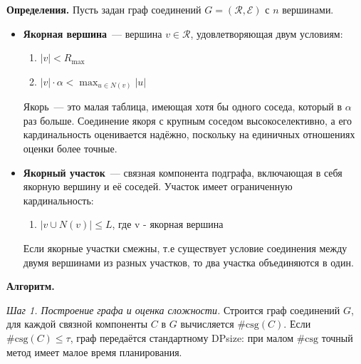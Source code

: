 \textbf{Определения.}
Пусть задан граф соединений $G = (\mathcal{R}, \mathcal{E})$ с $n$ вершинами.
\begin{itemize}
    \item \textbf{Якорная вершина}~--- вершина $v \in \mathcal{R}$, удовлетворяющая
    двум условиям:
    \begin{enumerate}
        \item $|v| < R_{\max}$
        \item $|v| \cdot \alpha < \max_{u \in N(v)} |u|$
    \end{enumerate}
    Якорь~--- это малая таблица, имеющая хотя бы одного соседа,
    который в $\alpha$ раз больше. Соединение якоря с крупным соседом высокоселективно,
    а его кардинальность оценивается надёжно, поскольку на единичных отношениях 
    оценки более точные.

    \item \textbf{Якорный участок}~--- связная компонента подграфа, включающая в себя якорную вершину 
    и её соседей. Участок имеет ограниченную кардинальность:
    \begin{enumerate}
        \item $|v \cup N(v)| \leqslant L$, где v - якорная вершина
    \end{enumerate}
    Если якорные участки смежны, т.е существует условие соединения между двумя вершинами 
    из разных участков, то два участка объединяются в один.
\end{itemize}

\textbf{Алгоритм.}
\par

\textit{Шаг 1. Построение графа и оценка сложности.}
Строится граф соединений $G$, для каждой связной компоненты 
$C$ в $G$ вычисляется $\#\mathrm{csg}(C)$.
Если $\#\mathrm{csg}(C) \leqslant \tau$,
граф передаётся стандартному DPsize:
при малом $\#\mathrm{csg}$ точный метод имеет малое время планирования.
\par

